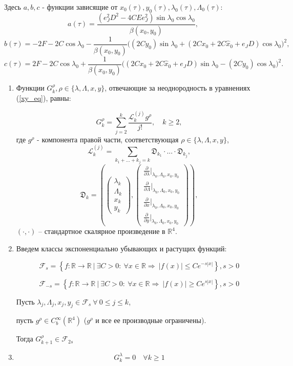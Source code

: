 Здесь $a,b,c$ - функции зависящие от $x_0(\tau), y_0(\tau), \lambda_0(\tau), \Lambda_0(\tau)$:
$$a(\tau) = \frac{\left( e_J^2 D^2 - 4CEe_J^2\right) \sin \lambda_0 \cos \lambda_0}{\beta(x_0,y_0)},$$
$$b(\tau) = -2F - 2C \cos \lambda_0 - \frac{1}{\beta(x_0,y_0)} \big( (2Cy_0)\sin \lambda_0 + (2Cx_0+2C \hat x_0 + e_JD)\cos \lambda_0  \big)^2,$$
$$c(\tau) = 2F - 2C \cos \lambda_0 + \frac{1}{\beta(x_0,y_0)} \big( (2Cx_0+2C \hat x_0 + e_JD)\sin \lambda_0 - (2Cy_0)\cos \lambda_0  \big)^2.$$
\begin{utv}

\begin{enumerate}

\item Функции $G_k^\rho, \rho \in \{\lambda,\Lambda,x,y\}$, отвечающие за неоднородность в уравнениях (\ref{xy_eq}), равны:

$$G_k^\rho = \sum_{j=2}^{k} \frac{\mathcal{L}_k^{(j)} g^\rho }{j!}, \quad k \ge 2,$$
где $g^\rho$ - компонента правой части, соответствующая $\rho \in \{ \lambda, \Lambda, x, y \}$,
$$\mathcal{L}_k^{(j)} = \sum_{k_1+...+k_j = k} \mathfrak{D}_{k_1} \cdot ... \cdot \mathfrak{D}_{k_j},$$
$$\mathfrak{D}_k = \left( \begin{pmatrix} \lambda_k\\ \Lambda_k \\ x_k \\ y_k \end{pmatrix},\begin{pmatrix} \frac{\partial}{\partial \lambda} |_{\lambda_0,\Lambda_0,x_0,y_0}\\ \frac{\partial}{\partial \Lambda} |_{\lambda_0,\Lambda_0,x_0,y_0} \\ \frac{\partial}{\partial x} |_{\lambda_0,\Lambda_0,x_0,y_0} \\ \frac{\partial}{\partial y} |_{\lambda_0,\Lambda_0,x_0,y_0} \end{pmatrix} \right),$$
$(\cdot,\cdot)$ -- стандартное скалярное произведение в $\mathbb{R}^4$.

\item Введем классы экспоненциально убывающих и растущих функций:

\[
\mathcal{F}_s = \left\{ f \colon \mathbb{R} \to \mathbb{R} \ \Big| \ \exists C > 0: \ \forall x \in \mathbb{R} \Rightarrow \ |f(x)| \leq C e^{-s|x|} \right\}, s > 0
\]

\[
\mathcal{F}_{-s} = \left\{ f \colon \mathbb{R} \to \mathbb{R} \ \Big| \ \exists C > 0: \ \forall x \in \mathbb{R} \Rightarrow \ |f(x)| \geq C e^{s|x|} \right\}, s > 0
\]

Пусть $\lambda_j, \Lambda_j, x_j, y_j \in \mathcal{F}_s \ \forall \ 0 \le j \le k$, 

пусть $g^\rho \in C_b^{\infty} (\mathbb{R}^4)$ ($g^\rho$ и все ее производные ограничены).

Тогда $G_{k+1}^\rho \in \mathcal{F}_{2s}$

\item $$G_k^\lambda = 0 \quad \forall k \ge 1$$  
\end{enumerate}

\end{utv}
